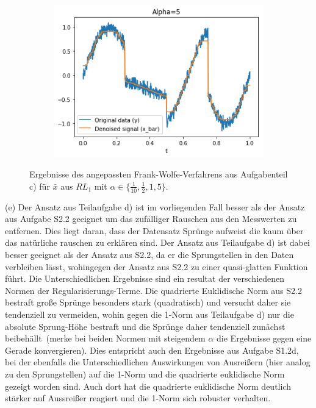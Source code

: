 \documentclass[ngerman, a4paper,12pt]{article}
\begin{document}
\begin{figure}[h]
\begin{subfigure}[b]{0.45\textwidth}
		\label{3a1}
	\end{subfigure}
	\begin{subfigure}[b]{0.45\textwidth}
		\includegraphics[width=1\columnwidth]{Images/3a5.png}
		\label{3a5}
	\end{subfigure}
	\caption{Ergebnisse des angepassten Frank-Wolfe-Verfahrens aus Aufgabenteil c) für $\bar{x}$ aus $RL_1$ mit $\alpha \in \{\frac{1}{10}, \frac{1}{2}, 1, 5\}$.}
	\vspace{-20pt}
\end{figure}
\par
(e) Der Ansatz aus Teilaufgabe d) ist im vorliegenden Fall besser als der Ansatz aus Aufgabe S2.2 geeignet um das zufälliger Rauschen aus den Messwerten zu entfernen. Dies liegt daran, dass der Datensatz Sprünge aufweist die kaum über das natürliche rauschen zu erklären sind. Der Ansatz aus Teilaufgabe d) ist dabei besser geeignet als der Ansatz aus S2.2, da er die Sprungstellen in den Daten verbleiben lässt, wohingegen der Ansatz aus S2.2 zu einer quasi-glatten Funktion führt. Die Unterschiedlichen Ergebnisse sind ein resultat der verschiedenen Normen der Regularisierungs-Terme. Die quadrierte Euklidische Norm aus S2.2 bestraft große Sprünge besonders stark (quadratisch) und versucht daher sie tendenziell \glqq zu vermeiden\grqq, wohin gegen die 1-Norm aus Teilaufgabe d) nur die absolute Sprung-Höhe bestraft und die Sprünge daher tendenziell zunächst \glqq beibehällt\grqq ~(merke bei beiden Normen mit steigendem $\alpha$ die Ergebnisse gegen eine Gerade konvergieren). Dies entspricht auch den Ergebnisse aus Aufgabe S1.2d, bei der ebenfalls die Unterschiedlichen Auswirkungen von Ausreißern (hier analog zu den Sprungstellen) auf die 1-Norm und die quadrierte euklidische Norm gezeigt worden sind. Auch dort hat die quadrierte euklidische Norm deutlich stärker auf Aussreißer reagiert und die 1-Norm sich robuster verhalten.
\par
\end{document}
